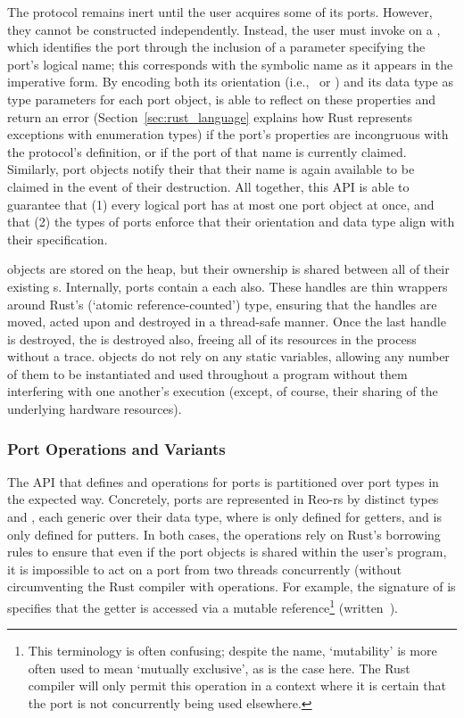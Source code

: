 The protocol remains inert until the user acquires some of its ports. However, they cannot be constructed independently. Instead, the user must invoke  on a , which identifies the port through the inclusion of a parameter specifying the port's logical name; this corresponds with the symbolic name as it appears in the imperative form. By encoding both its orientation (i.e.,\  or ) and its data type as type parameters for each port object,  is able to reflect on these properties and return an error (Section~\ref{sec:rust_language} explains how Rust represents exceptions with enumeration types) if the port's properties are incongruous with the protocol's definition, or if the port of that name is currently claimed. Similarly, port objects notify their  that their name is again available to be claimed in the event of their destruction. All together, this API is able to guarantee that (1) every logical port has at most one port object at once, and that (2) the types of ports enforce that their orientation and data type align with their specification.

 objects are stored on the heap, but their ownership is shared between all of their existing s. Internally, ports contain a  each also. These handles are thin wrappers around Rust's  (`atomic reference-counted') type, ensuring that the handles are moved, acted upon and destroyed in a thread-safe manner. Once the last handle is destroyed, the  is destroyed also, freeing all of its resources in the process without a trace.  objects do not rely on any static variables, allowing any number of them to be instantiated and used throughout a program without them interfering with one another's execution (except, of course, their sharing of the underlying hardware resources). 

\subsubsection{Port Operations and Variants}
\label{sec:port_operations}
The API that defines  and  operations for ports is partitioned over port types in the expected way. Concretely, ports are represented in Reo-rs by distinct types  and , each generic over their data type, where  is only defined for getters, and  is only defined for putters. In both cases, the operations rely on Rust's borrowing rules to ensure that even if the port objects is shared within the user's program, it is impossible to act on a port from two threads concurrently (without circumventing the Rust compiler with  operations. For example, the signature of  is specifies that the getter is accessed via a mutable reference\footnote{This terminology is often confusing; despite the name, `mutability' is more often used to mean `mutually exclusive', as is the case here. The Rust compiler will only permit this operation in a context where it is certain that the port is not concurrently being used elsewhere.} (written~).

